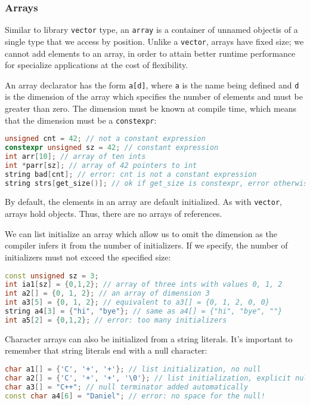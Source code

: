 \subsubsection{Arrays}

Similar to library \texttt{vector} type, an \texttt{array} is a container of unnamed objectis of a single type that we access by position. Unlike a \texttt{vector}, arrays have fixed size; we cannot add elements to an array, in order to attain better runtime performance for specialize applications at the cost of flexibility.

An array declarator has the form \texttt{a[d]}, where \texttt{a} is the name being defined and \texttt{d} is the dimension of the array which specifies the number of elements and must be greater than zero. The dimension must be known at compile time, which means that the dimension must be a \texttt{constexpr}:
\begin{lstlisting}[language=C++]
unsigned cnt = 42; // not a constant expression 
constexpr unsigned sz = 42; // constant expression 
int arr[10]; // array of ten ints 
int *parr[sz]; // array of 42 pointers to int 
string bad[cnt]; // error: cnt is not a constant expression 
string strs[get_size()]; // ok if get_size is constexpr, error otherwise
\end{lstlisting}
By default, the elements in an array are default initialized. As with \texttt{vector}, arrays hold objects. Thus, there are no arrays of references.

We can list initialize an array which allow us to omit the dimension as the compiler infers it from the number of initializers. If we specify, the number of initializers must not exceed the specified size:
\begin{lstlisting}[language=C++]
const unsigned sz = 3; 
int ia1[sz] = {0,1,2}; // array of three ints with values 0, 1, 2 
int a2[] = {0, 1, 2}; // an array of dimension 3 
int a3[5] = {0, 1, 2}; // equivalent to a3[] = {0, 1, 2, 0, 0} 
string a4[3] = {"hi", "bye"}; // same as a4[] = {"hi", "bye", ""} 
int a5[2] = {0,1,2}; // error: too many initializers
\end{lstlisting}

Character arrays can also be initialized from a string literals. It's important to remember that string literals end with a null character:
\begin{lstlisting}[language=C++]
char a1[] = {'C', '+', '+'}; // list initialization, no null 
char a2[] = {'C', '+', '+', '\0'}; // list initialization, explicit null 
char a3[] = "C++"; // null terminator added automatically 
const char a4[6] = "Daniel"; // error: no space for the null!
\end{lstlisting}

